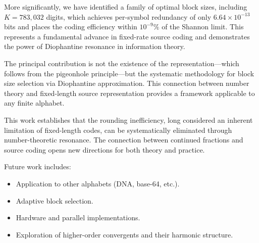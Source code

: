 \documentclass[10pt, onecolumn]{IEEEtran}
\begin{document}
More significantly, we have identified a family of optimal block sizes, including $K=783,032$ digits, which achieves per-symbol redundancy of only $6.64\times10^{-13}$ bits and places the coding efficiency within $10^{-9}\%$ of the Shannon limit. This represents a fundamental advance in fixed-rate source coding and demonstrates the power of Diophantine resonance in information theory.

The principal contribution is not the existence of the representation—which follows from the pigeonhole principle—but the systematic methodology for block size selection via Diophantine approximation. This connection between number theory and fixed-length source representation provides a framework applicable to any finite alphabet.

This work establishes that the rounding inefficiency, long considered an inherent limitation of fixed-length codes, can be systematically eliminated through number-theoretic resonance. The connection between continued fractions and source coding opens new directions for both theory and practice.

Future work includes:
\begin{itemize}
    \item Application to other alphabets (DNA, base-64, etc.).
    \item Adaptive block selection.
    \item Hardware and parallel implementations.
    \item Exploration of higher-order convergents and their harmonic structure.
\end{itemize}
\end{document}

